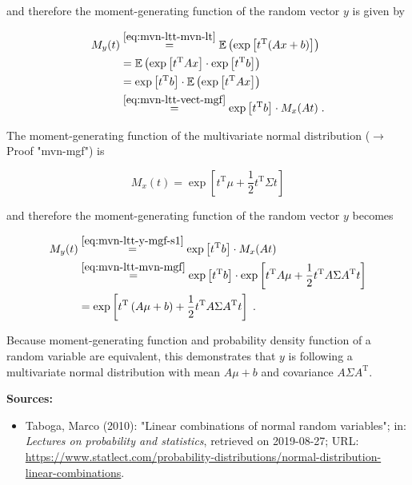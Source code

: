 \documentclass[a4paper,12pt,twoside]{book}
\begin{document}
and therefore the moment-generating function of the random vector $y$ is given by

\begin{equation} \label{eq:mvn-ltt-y-mgf-s1}
\begin{split}
M_y(t) &\overset{\eqref{eq:mvn-ltt-mvn-lt}}{=} \mathbb{E} \left( \exp \left[ t^\mathrm{T} (Ax + b) \right] \right) \\
&= \mathbb{E} \left( \exp \left[ t^\mathrm{T} A x \right] \cdot \exp \left[ t^\mathrm{T} b \right] \right) \\
&= \exp \left[ t^\mathrm{T} b \right] \cdot \mathbb{E} \left( \exp \left[ t^\mathrm{T} A x \right] \right) \\
&\overset{\eqref{eq:mvn-ltt-vect-mgf}}{=} \exp \left[ t^\mathrm{T} b \right] \cdot M_x(At) \; .
\end{split}
\end{equation}

The moment-generating function of the multivariate normal distribution ($\rightarrow$ Proof "mvn-mgf") is

\begin{equation} \label{eq:mvn-ltt-mvn-mgf}
M_x(t) = \exp \left[ t^\mathrm{T} \mu + \frac{1}{2} t^\mathrm{T} \Sigma t \right]
\end{equation}

and therefore the moment-generating function of the random vector $y$ becomes

\begin{equation} \label{eq:mvn-ltt-y-mgf-s2}
\begin{split}
M_y(t) &\overset{\eqref{eq:mvn-ltt-y-mgf-s1}}{=} \exp \left[ t^\mathrm{T} b \right] \cdot M_x(At) \\
&\overset{\eqref{eq:mvn-ltt-mvn-mgf}}{=} \exp \left[ t^\mathrm{T} b \right] \cdot \exp \left[ t^\mathrm{T} A \mu + \frac{1}{2} t^\mathrm{T} A \Sigma A^\mathrm{T} t \right] \\
&= \exp \left[ t^\mathrm{T} \left( A \mu + b \right) + \frac{1}{2} t^\mathrm{T} A \Sigma A^\mathrm{T} t \right] \; .
\end{split}
\end{equation}

Because moment-generating function and probability density function of a random variable are equivalent, this demonstrates that $y$ is following a multivariate normal distribution with mean $A \mu + b$ and covariance $A \Sigma A^\mathrm{T}$.


\vspace{1em}
\textbf{Sources:}
\begin{itemize}
\item Taboga, Marco (2010): "Linear combinations of normal random variables"; in: \textit{Lectures on probability and statistics}, retrieved on 2019-08-27; URL: \url{https://www.statlect.com/probability-distributions/normal-distribution-linear-combinations}.
\end{itemize}
\end{document}
